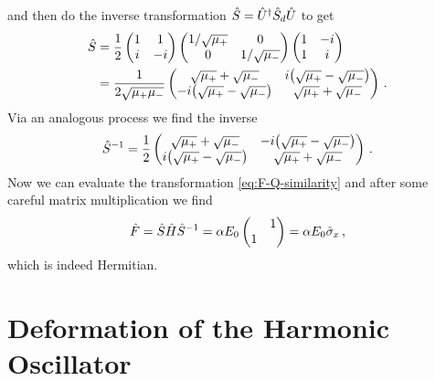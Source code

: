         and then do the inverse transformation $\hat{S} = \hat{U}^\dag \hat{S}_d \hat{U}$ to get
        \begin{align*}
            \hS &= \frac{1}{2}\pmqty{1 & 1 \\ i & -i}  \pmqty{\dmat[0]{1/\sqrt{\mu_{+}}, 1/\sqrt{\mu_{-}}}} \pmqty{1 & -i \\ 1 & i} \\
            &= \frac{1}{2\sqrt{\mu_{+}\mu_{-}}} \pmqty{\admat[\sqrt{\mu_{+}} + \sqrt{\mu_{-}}]{i\pqty{\sqrt{\mu_{+}} - \sqrt{\mu_{-}}} , -i\pqty{\sqrt{\mu_{+}} - \sqrt{\mu_{-}}}}}
            \myperiod
        \end{align*}
        Via an analogous process we find the inverse
        \begin{align*}
            \hS^{-1} = \frac{1}{2} \pmqty{\admat[\sqrt{\mu_{+}} + \sqrt{\mu_{-}}]{-i\pqty{\sqrt{\mu_{+}} - \sqrt{\mu_{-}}} , i\pqty{\sqrt{\mu_{+}} - \sqrt{\mu_{-}}}}}
            \myperiod
        \end{align*}
        Now we can evaluate the transformation \eqref{eq:F-Q-similarity} and after some careful matrix multiplication we find 
        \begin{equation*}
            \hF = \hS \hH \hS^{-1}
            = \alpha E_0 \pmqty{\admat{1,1}}
            = \alpha E_0 \togglehat{\sigma}_x
            \mycomma
        \end{equation*}
        which is indeed Hermitian.
        
        
        \section{Deformation of the Harmonic Oscillator}